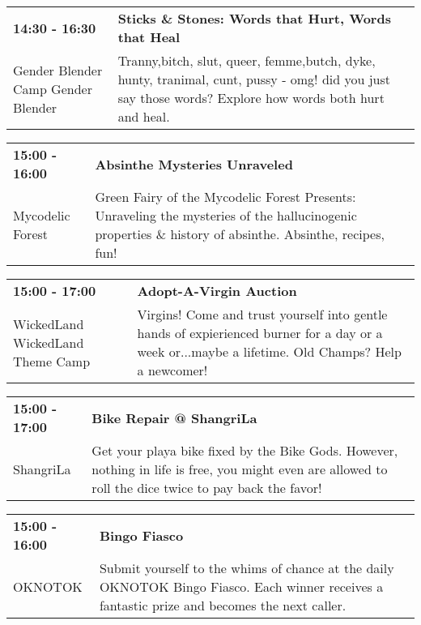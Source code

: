\begin{tabular}{ p{1in} p{2.2in} }
    \textbf{14:30 - 16:30} & \textbf{Sticks \& Stones: Words that Hurt, Words that Heal} \\
    Gender Blender \newline Camp Gender Blender & Tranny,bitch, slut, queer, femme,butch, dyke, hunty, tranimal, cunt, pussy - omg! did you just say those words? Explore how words both hurt and heal. \\
    \hline 
\end{tabular}
    
\begin{tabular}{ p{1in} p{2.2in} }
    \textbf{15:00 - 16:00} & \textbf{Absinthe Mysteries Unraveled} \\
    Mycodelic Forest \newline  & Green Fairy of the Mycodelic Forest Presents: Unraveling the mysteries of the hallucinogenic properties \& history of absinthe. Absinthe, recipes, fun! \\
    \hline 
\end{tabular}
    
\begin{tabular}{ p{1in} p{2.2in} }
    \textbf{15:00 - 17:00} & \textbf{Adopt-A-Virgin Auction} \\
    WickedLand \newline WickedLand Theme Camp & Virgins! Come and trust yourself into gentle hands of expierienced burner for a day or a week or...maybe a lifetime. Old Champs? Help a newcomer! \\
    \hline 
\end{tabular}
    
\begin{tabular}{ p{1in} p{2.2in} }
    \textbf{15:00 - 17:00} & \textbf{Bike Repair @ ShangriLa} \\
    ShangriLa \newline  & Get your playa bike fixed by the Bike Gods. However, nothing in life is free, you might even are allowed to roll the dice twice to pay back the favor! \\
    \hline 
\end{tabular}
    
\begin{tabular}{ p{1in} p{2.2in} }
    \textbf{15:00 - 16:00} & \textbf{Bingo Fiasco} \\
    OKNOTOK \newline  & Submit yourself to the whims of chance at the daily OKNOTOK Bingo Fiasco. Each winner receives a fantastic prize and becomes the next caller. \\
    \hline 
\end{tabular}
    
